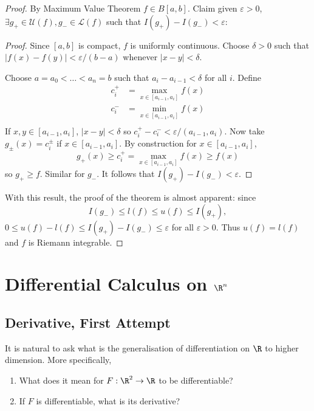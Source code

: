 \documentclass[a4paper]{article}
\newcommand*{\riem}[1]{\mathcal{#1}}
\theoremstyle{definition}
\begin{document}
\begin{proof}
  By Maximum Value Theorem \(f \in B[a, b]\). Claim given \(\varepsilon > 0\), \(\exists g_+ \in \riem U(f), g_- \in \riem L(f)\) such that \(I(g_+) - I(g_-) < \varepsilon\):
  \begin{proof}
    Since \([a, b]\) is compact, \(f\) is uniformly continuous. Choose \(\delta > 0 \) such that \(|f(x) - f(y)| < \varepsilon/(b-a)\) whenever \(|x - y| < \delta\).
    
    Choose \(a = a_0 < \dots < a_n = b\) such that \(a_i - a_{i-1} < \delta\) for all \(i\). Define
    \begin{align*}
      c_i^+ &= \max_{x \in [a_{i-1}, a_i]} f(x) \\
      c_i^- &= \min_{x \in [a_{i-1}, a_i]} f(x) \\
    \end{align*}
    If \(x, y \in [a_{i-1}, a_i]\), \(|x - y| < \delta\) so \(c_i^+ - c_i^- < \varepsilon/(a_{i-1}, a_i)\). Now take \(g_\pm(x) = c_i^\pm\) if \(x \in [a_{i-1}, a_i]\). By construction for \(x \in [a_{i-1}, a_i]\),
    \[
      g_+(x) \geq c_i^+ = \max_{x \in [a_{i-1}, a_i]}f(x) \geq f(x)
    \]
    so \(g_+ \geq f\). Similar for \(g_-\). It follows that \(I(g_+) - I(g_-) < \varepsilon\).
  \end{proof}

  With this result, the proof of the theorem is almost apparent: since
  \[
    I(g_-) \leq l(f) \leq u(f) \leq I(g_+),
  \]
  \(0 \leq u(f) - l(f) \leq I(g_+) - I(g_-) \leq \varepsilon\) for all \(\varepsilon > 0\). Thus \(u(f) = l(f)\) and \(f\) is Riemann integrable.
\end{proof}

\section{Differential Calculus on \texorpdfstring{\(\R^n\)}{ℝ\^{}n}}

\subsection{Derivative, First Attempt}

It is natural to ask what is the generalisation of differentiation on \(\R\) to higher dimension. More specifically,

\begin{question}\leavevmode
  \begin{enumerate}
  \item What does it mean for \(F: \R^2 \to \R\) to be differentiable?
  \item If \(F\) is differentiable, what is its derivative?
  \end{enumerate}
\end{question}
\end{document}
